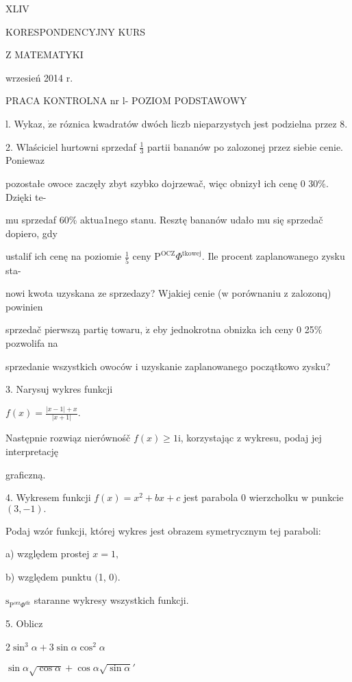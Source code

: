 \documentclass[a4paper,12pt]{article}
\begin{document}
XLIV

KORESPONDENCYJNY KURS

Z MATEMATYKI

wrzesień 2014 r.

PRACA KONTROLNA nr l- POZIOM PODSTAWOWY

l. Wykaz, $\dot{\mathrm{z}}\mathrm{e}$ róznica kwadratów dwóch liczb nieparzystych jest podzielna przez 8.

2. Wlaściciel hurtowni sprzedaf $\displaystyle \frac{1}{3}$ partii bananów po zalozonej przez siebie cenie. Poniewaz

pozostałe owoce zaczęły zbyt szybko dojrzewač, więc obnizył ich cenę $0$ 30\%. Dzięki te-

mu sprzedaf 60\% aktua1nego stanu. Resztę bananów udało mu się sprzedač dopiero, gdy

ustalif ich cenę na poziomie $\displaystyle \frac{1}{5}$ ceny $\mathrm{P}^{\mathrm{O}\mathrm{C}\mathrm{Z}}\Phi^{\mathrm{t}\mathrm{k}\mathrm{o}\mathrm{w}\mathrm{e}\mathrm{j}}$. Ile procent zaplanowanego zysku sta-

nowi kwota uzyskana ze sprzedazy? Wjakiej cenie ($\mathrm{w}$ porównaniu $\mathrm{z}$ zalozonq) powinien

sprzedač pierwszą partię towaru, $\dot{\mathrm{z}}$ eby jednokrotna obnizka ich ceny $0$ 25\% pozwolifa na

sprzedanie wszystkich owoców $\mathrm{i}$ uzyskanie zaplanowanego początkowo zysku?

3. Narysuj wykres funkcji

$f(x)=\displaystyle \frac{|x-1|+x}{|x+1|}.$

Następnie rozwiąz nierównośč $f(x)\geq 1 \mathrm{i}$, korzystając $\mathrm{z}$ wykresu, podaj jej interpretację

graficzną.

4. Wykresem funkcji $f(x) =x^{2}+bx+c$ jest parabola $0$ wierzcholku $\mathrm{w}$ punkcie $(3,-1).$

Podaj wzór funkcji, której wykres jest obrazem symetrycznym tej paraboli:

a) względem prostej $x=1,$

b) względem punktu $($1, $0).$

$\mathrm{s}_{\mathrm{P}^{\mathrm{o}\mathrm{r}\mathrm{z}}\Phi^{\mathrm{d}\acute{\mathrm{z}}}}$ staranne wykresy wszystkich funkcji.

5. Oblicz

2$\sin^{3}\alpha+3\sin\alpha\cos^{2}\alpha$

$\sin\alpha\sqrt{\cos\alpha}+\cos\alpha\sqrt{\sin\alpha}'$
\end{document}

